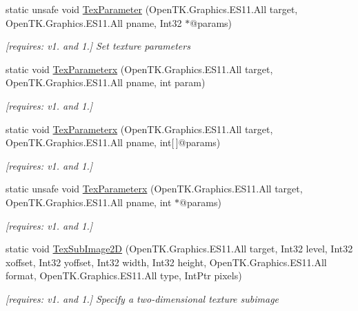 \begin{DoxyCompactItemize}
static unsafe void \hyperlink{class_open_t_k_1_1_graphics_1_1_e_s11_1_1_g_l_a9a5085b1e749afe18257d536b9d10bba}{Tex\-Parameter} (Open\-T\-K.\-Graphics.\-E\-S11.\-All target, Open\-T\-K.\-Graphics.\-E\-S11.\-All pname, Int32 $\ast$@params)
\begin{DoxyCompactList}\small\item\em \mbox{[}requires\-: v1. and 1.\mbox{]} Set texture parameters \end{DoxyCompactList}\item 
static void \hyperlink{class_open_t_k_1_1_graphics_1_1_e_s11_1_1_g_l_a90804699e2826277975c30b12d448168}{Tex\-Parameterx} (Open\-T\-K.\-Graphics.\-E\-S11.\-All target, Open\-T\-K.\-Graphics.\-E\-S11.\-All pname, int param)
\begin{DoxyCompactList}\small\item\em \mbox{[}requires\-: v1. and 1.\mbox{]}\end{DoxyCompactList}\item 
static void \hyperlink{class_open_t_k_1_1_graphics_1_1_e_s11_1_1_g_l_adec10e2159b13f00589e5e82cc311f7b}{Tex\-Parameterx} (Open\-T\-K.\-Graphics.\-E\-S11.\-All target, Open\-T\-K.\-Graphics.\-E\-S11.\-All pname, int\mbox{[}$\,$\mbox{]}@params)
\begin{DoxyCompactList}\small\item\em \mbox{[}requires\-: v1. and 1.\mbox{]}\end{DoxyCompactList}\item 
static unsafe void \hyperlink{class_open_t_k_1_1_graphics_1_1_e_s11_1_1_g_l_a9cd3be4d8d54039ad260255ce21a8766}{Tex\-Parameterx} (Open\-T\-K.\-Graphics.\-E\-S11.\-All target, Open\-T\-K.\-Graphics.\-E\-S11.\-All pname, int $\ast$@params)
\begin{DoxyCompactList}\small\item\em \mbox{[}requires\-: v1. and 1.\mbox{]}\end{DoxyCompactList}\item 
static void \hyperlink{class_open_t_k_1_1_graphics_1_1_e_s11_1_1_g_l_a78955e98abe66e01bf688368277d9c77}{Tex\-Sub\-Image2\-D} (Open\-T\-K.\-Graphics.\-E\-S11.\-All target, Int32 level, Int32 xoffset, Int32 yoffset, Int32 width, Int32 height, Open\-T\-K.\-Graphics.\-E\-S11.\-All format, Open\-T\-K.\-Graphics.\-E\-S11.\-All type, Int\-Ptr pixels)
\begin{DoxyCompactList}\small\item\em \mbox{[}requires\-: v1. and 1.\mbox{]} Specify a two-\/dimensional texture subimage \end{DoxyCompactList}\item 

\end{DoxyCompactItemize}
